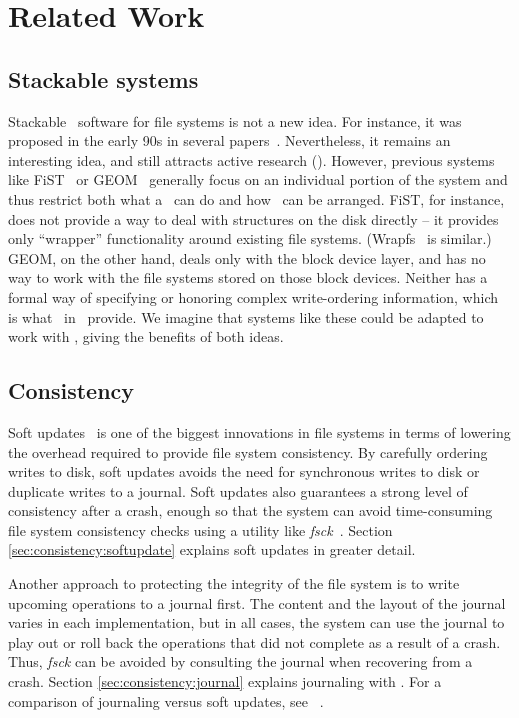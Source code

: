 \section{Related Work}
\label{sec:related}

\subsection{Stackable systems}


Stackable \module\ software for file systems is not a new idea. For instance,
it was proposed in the early 90s in several papers~\cite{rosenthal90evolving,
heidemann91layered, skinner93stacking, heidemann94filesystem}. Nevertheless,
it remains an interesting idea, and still attracts active research
(\cite{zadok99extending, zadok00fist}). However, previous systems like
FiST~\cite{zadok00fist} or GEOM~\cite{geom} generally focus on an individual
portion of the system and thus restrict both what a \module\ can do and how
\modules\ can be arranged. FiST, for instance, does not provide a way to deal
with structures on the disk directly -- it provides only ``wrapper''
functionality around existing file systems. (Wrapfs~\cite{zadok99stackable,
zadok99extending} is similar.) GEOM, on the other hand, deals only with the
block device layer, and has no way to work with the file systems stored on
those block devices. Neither has a formal way of specifying or honoring
complex write-ordering information, which is what \chdescs\ in \Kudos\
provide. We imagine that systems like these could be adapted to work with
\chdescs, giving the benefits of both ideas.

\subsection{Consistency}

Soft updates~\cite{ganger00soft} is one of the biggest innovations in file
systems in terms of lowering the overhead required to provide file system
consistency. By carefully ordering writes to disk, soft updates avoids the need
for synchronous writes to disk or duplicate writes to a journal. Soft updates
also guarantees a strong level of consistency after a crash, enough so that the
system can avoid time-consuming file system consistency checks using a utility
like \emph{fsck}~\cite{mckusick94fsck}. Section \ref{sec:consistency:softupdate}
explains soft updates in greater detail.

Another approach to protecting the integrity of the file system is to write
upcoming operations to a journal first. The content and the layout of the
journal varies in each implementation, but in all cases, the system can use the
journal to play out or roll back the operations that did not complete as a
result of a crash. Thus, \emph{fsck} can be avoided by consulting the journal
when recovering from a crash. Section \ref{sec:consistency:journal} explains
journaling with \chdescs. For a comparison of journaling versus soft updates,
see ~\cite{seltzer00journaling}.

